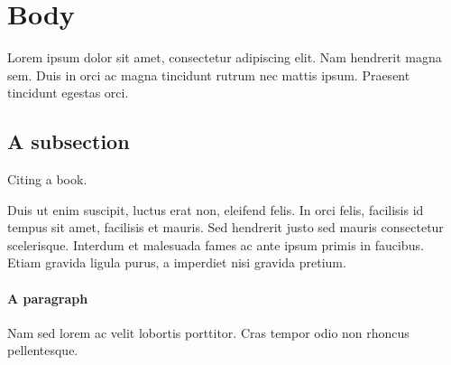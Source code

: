 \section{Body} \label{sec:body}

Lorem ipsum dolor sit amet, consectetur adipiscing elit. Nam hendrerit magna sem. Duis in orci ac magna tincidunt rutrum nec mattis ipsum. Praesent tincidunt egestas orci.

\subsection{A subsection}

Citing a book\cite{the_d_programming_language}.

Duis ut enim suscipit, luctus erat non, eleifend felis. In orci felis, facilisis id tempus sit amet, facilisis et mauris. Sed hendrerit justo sed mauris consectetur scelerisque. Interdum et malesuada fames ac ante ipsum primis in faucibus. Etiam gravida ligula purus, a imperdiet nisi gravida pretium.

\paragraph{A paragraph}

Nam sed lorem ac velit lobortis porttitor. Cras tempor odio non rhoncus pellentesque.
